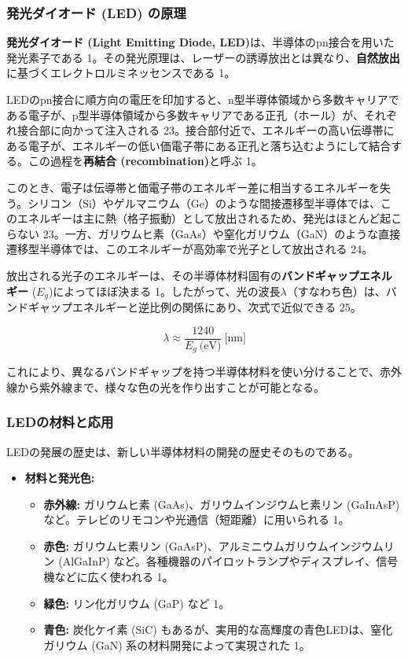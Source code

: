 \documentclass[11pt,a4paper]{ltjsarticle}
\begin{document}
\subsubsection*{発光ダイオード (LED) の原理}

\textbf{発光ダイオード (Light Emitting Diode, LED)}は、半導体のpn接合を用いた発光素子である 1。その発光原理は、レーザーの誘導放出とは異なり、\textbf{自然放出}に基づくエレクトロルミネッセンスである 1。

LEDのpn接合に順方向の電圧を印加すると、n型半導体領域から多数キャリアである電子が、p型半導体領域から多数キャリアである正孔（ホール）が、それぞれ接合部に向かって注入される 23。接合部付近で、エネルギーの高い伝導帯にある電子が、エネルギーの低い価電子帯にある正孔と落ち込むようにして結合する。この過程を\textbf{再結合 (recombination)}と呼ぶ 1。

このとき、電子は伝導帯と価電子帯のエネルギー差に相当するエネルギーを失う。シリコン（Si）やゲルマニウム（Ge）のような間接遷移型半導体では、このエネルギーは主に熱（格子振動）として放出されるため、発光はほとんど起こらない 23。一方、ガリウムヒ素（GaAs）や窒化ガリウム（GaN）のような直接遷移型半導体では、このエネルギーが高効率で光子として放出される 24。

放出される光子のエネルギーは、その半導体材料固有の\textbf{バンドギャップエネルギー} ($E_g$)によってほぼ決まる 1。したがって、光の波長$\lambda$（すなわち色）は、バンドギャップエネルギーと逆比例の関係にあり、次式で近似できる 25。

\begin{equation}
\lambda \approx \frac{1240}{E_g\ \text{(eV)}}\ \text{[nm]}
\end{equation}

これにより、異なるバンドギャップを持つ半導体材料を使い分けることで、赤外線から紫外線まで、様々な色の光を作り出すことが可能となる。

\subsubsection*{LEDの材料と応用}

LEDの発展の歴史は、新しい半導体材料の開発の歴史そのものである。

\begin{itemize}
\item \textbf{材料と発光色:}
\begin{itemize}
\item \textbf{赤外線:} ガリウムヒ素 (GaAs)、ガリウムインジウムヒ素リン (GaInAsP) など。テレビのリモコンや光通信（短距離）に用いられる 1。
\item \textbf{赤色:} ガリウムヒ素リン (GaAsP)、アルミニウムガリウムインジウムリン (AlGaInP) など。各種機器のパイロットランプやディスプレイ、信号機などに広く使われる 1。
\item \textbf{緑色:} リン化ガリウム (GaP) など 1。
\item \textbf{青色:} 炭化ケイ素 (SiC) もあるが、実用的な高輝度の青色LEDは、窒化ガリウム (GaN) 系の材料開発によって実現された 1。
\end{itemize}
\end{itemize}
\end{document}
